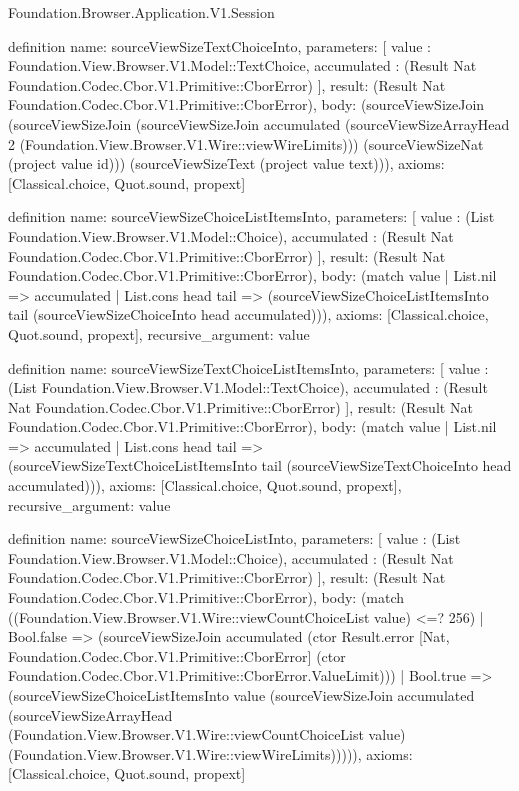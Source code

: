 \begin{lexlean}{Foundation.Browser.Application.V1.Session}
\begin{semanticmodule}
definition{
  name: sourceViewSizeTextChoiceInto,
  parameters: [
    value : Foundation.View.Browser.V1.Model::TextChoice,
    accumulated : (Result Nat Foundation.Codec.Cbor.V1.Primitive::CborError)
  ],
  result: (Result Nat Foundation.Codec.Cbor.V1.Primitive::CborError),
  body: (sourceViewSizeJoin (sourceViewSizeJoin (sourceViewSizeJoin accumulated (sourceViewSizeArrayHead 2 (Foundation.View.Browser.V1.Wire::viewWireLimits))) (sourceViewSizeNat (project value id))) (sourceViewSizeText (project value text))),
  axioms: [Classical.choice, Quot.sound, propext]
}

definition{
  name: sourceViewSizeChoiceListItemsInto,
  parameters: [
    value : (List Foundation.View.Browser.V1.Model::Choice),
    accumulated : (Result Nat Foundation.Codec.Cbor.V1.Primitive::CborError)
  ],
  result: (Result Nat Foundation.Codec.Cbor.V1.Primitive::CborError),
  body: (match value
    | List.nil => accumulated
    | List.cons head tail => (sourceViewSizeChoiceListItemsInto tail (sourceViewSizeChoiceInto head accumulated))),
  axioms: [Classical.choice, Quot.sound, propext],
  recursive_argument: value
}

definition{
  name: sourceViewSizeTextChoiceListItemsInto,
  parameters: [
    value : (List Foundation.View.Browser.V1.Model::TextChoice),
    accumulated : (Result Nat Foundation.Codec.Cbor.V1.Primitive::CborError)
  ],
  result: (Result Nat Foundation.Codec.Cbor.V1.Primitive::CborError),
  body: (match value
    | List.nil => accumulated
    | List.cons head tail => (sourceViewSizeTextChoiceListItemsInto tail (sourceViewSizeTextChoiceInto head accumulated))),
  axioms: [Classical.choice, Quot.sound, propext],
  recursive_argument: value
}

definition{
  name: sourceViewSizeChoiceListInto,
  parameters: [
    value : (List Foundation.View.Browser.V1.Model::Choice),
    accumulated : (Result Nat Foundation.Codec.Cbor.V1.Primitive::CborError)
  ],
  result: (Result Nat Foundation.Codec.Cbor.V1.Primitive::CborError),
  body: (match ((Foundation.View.Browser.V1.Wire::viewCountChoiceList value) <=? 256)
    | Bool.false => (sourceViewSizeJoin accumulated (ctor Result.error [Nat, Foundation.Codec.Cbor.V1.Primitive::CborError] (ctor Foundation.Codec.Cbor.V1.Primitive::CborError.ValueLimit)))
    | Bool.true => (sourceViewSizeChoiceListItemsInto value (sourceViewSizeJoin accumulated (sourceViewSizeArrayHead (Foundation.View.Browser.V1.Wire::viewCountChoiceList value) (Foundation.View.Browser.V1.Wire::viewWireLimits))))),
  axioms: [Classical.choice, Quot.sound, propext]
}


\end{semanticmodule}
\end{lexlean}
